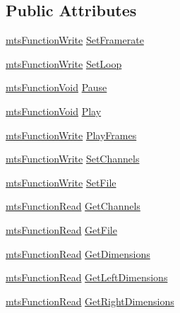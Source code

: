\subsection*{Public Attributes}
\begin{DoxyCompactItemize}
\item 
\hyperlink{classmts_function_write}{mts\-Function\-Write} \hyperlink{class_i_req_filter_source_image_file_a9195480b969ae523fe65ce266895bd21}{Set\-Framerate}
\item 
\hyperlink{classmts_function_write}{mts\-Function\-Write} \hyperlink{class_i_req_filter_source_image_file_a6c0b3f702b2fe002ad47838d9e6d71cb}{Set\-Loop}
\item 
\hyperlink{classmts_function_void}{mts\-Function\-Void} \hyperlink{class_i_req_filter_source_image_file_a0be80794d65c123743666d95f60a9962}{Pause}
\item 
\hyperlink{classmts_function_void}{mts\-Function\-Void} \hyperlink{class_i_req_filter_source_image_file_a6ee044cc752177e47fbb970e08aa509f}{Play}
\item 
\hyperlink{classmts_function_write}{mts\-Function\-Write} \hyperlink{class_i_req_filter_source_image_file_ad4ffadbe87635cbdfa01daa364f41fb5}{Play\-Frames}
\item 
\hyperlink{classmts_function_write}{mts\-Function\-Write} \hyperlink{class_i_req_filter_source_image_file_a277fb1f67abe840dca507ed8caebc051}{Set\-Channels}
\item 
\hyperlink{classmts_function_write}{mts\-Function\-Write} \hyperlink{class_i_req_filter_source_image_file_acbcd51d212dee25261263e552040eb4f}{Set\-File}
\item 
\hyperlink{classmts_function_read}{mts\-Function\-Read} \hyperlink{class_i_req_filter_source_image_file_a345befbf65ef845dc9f12921fb9af095}{Get\-Channels}
\item 
\hyperlink{classmts_function_read}{mts\-Function\-Read} \hyperlink{class_i_req_filter_source_image_file_a4df0bd4fef3fc0b59d836bb9d0877399}{Get\-File}
\item 
\hyperlink{classmts_function_read}{mts\-Function\-Read} \hyperlink{class_i_req_filter_source_image_file_aebb760df4d6adc0e26a3ec0fa28e51de}{Get\-Dimensions}
\item 
\hyperlink{classmts_function_read}{mts\-Function\-Read} \hyperlink{class_i_req_filter_source_image_file_a35e1beacc48aae0e258a695918a1a476}{Get\-Left\-Dimensions}
\item 
\hyperlink{classmts_function_read}{mts\-Function\-Read} \hyperlink{class_i_req_filter_source_image_file_acafc0bb36a8f27952379c4a6af59deef}{Get\-Right\-Dimensions}
\end{DoxyCompactItemize}


